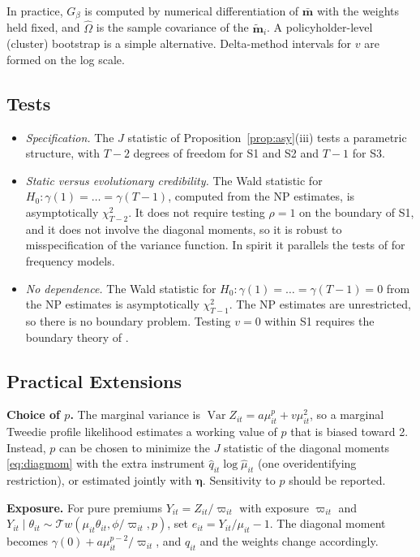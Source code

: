\documentclass[mathematics,article,submit,moreauthors]{Definitions/mdpi}
\DeclareMathOperator{\Var}{Var}
\newcommand{\Tw}{\mathcal{T}w}
\newcommand{\boeta}{\boldsymbol{\eta}}
\begin{document}
In practice, $G_\beta$ is computed by numerical differentiation of $\bar{\boldsymbol m}$ with the weights held fixed, and $\widehat\Omega$ is the sample covariance of the $\tilde{\boldsymbol m}_i$. A policyholder-level (cluster) bootstrap is a simple alternative. Delta-method intervals for $v$ are formed on the log scale.

\subsection{Tests}\label{sec:tests}

\begin{itemize}
\item \emph{Specification.} The $J$ statistic of Proposition~\ref{prop:asy}(iii) tests a parametric structure, with $T-2$ degrees of freedom for S1 and S2 and $T-1$ for S3.
\item \emph{Static versus evolutionary credibility.} The Wald statistic for $H_0:\gamma(1)=\dots=\gamma(T-1)$, computed from the NP estimates, is asymptotically $\chi^2_{T-2}$. It does not require testing $\rho=1$ on the boundary of S1, and it does not involve the diagonal moments, so it is robust to misspecification of the variance function. In spirit it parallels the tests of \citet{bolance2003} for frequency models.
\item \emph{No dependence.} The Wald statistic for $H_0:\gamma(1)=\dots=\gamma(T-1)=0$ from the NP estimates is asymptotically $\chi^2_{T-1}$. The NP estimates are unrestricted, so there is no boundary problem. Testing $v=0$ within S1 requires the boundary theory of \citet{andrews1999}.
\end{itemize}

\subsection{Practical Extensions}\label{sec:practical}

\textbf{Choice of $p$.} The marginal variance is $\Var Z_{it}=a\mu_{it}^p+v\mu_{it}^2$, so a marginal Tweedie profile likelihood estimates a working value of $p$ that is biased toward 2. Instead, $p$ can be chosen to minimize the $J$ statistic of the diagonal moments \eqref{eq:diagmom} with the extra instrument $\hat q_{it}\log\hat\mu_{it}$ (one overidentifying restriction), or estimated jointly with $\boeta$. Sensitivity to $p$ should be reported.

\textbf{Exposure.} For pure premiums $Y_{it}=Z_{it}/\varpi_{it}$ with exposure $\varpi_{it}$ and $Y_{it}\mid\theta_{it}\sim\Tw(\mu_{it}\theta_{it},\phi/\varpi_{it},p)$, set $e_{it}=Y_{it}/\mu_{it}-1$. The diagonal moment becomes $\gamma(0)+a\mu_{it}^{p-2}/\varpi_{it}$, and $q_{it}$ and the weights change accordingly.
\end{document}
